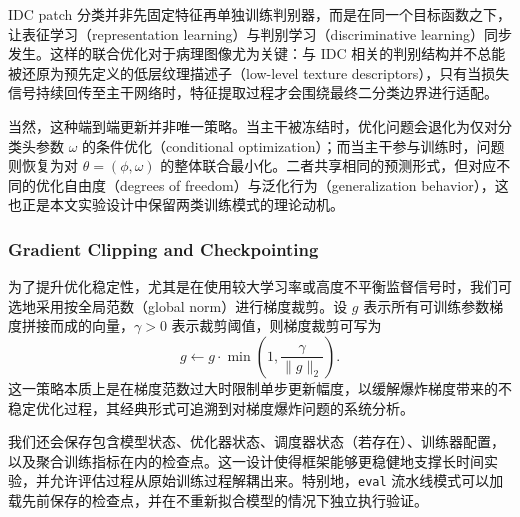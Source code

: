 IDC patch 分类并非先固定特征再单独训练判别器，而是在同一个目标函数之下，让表征学习（representation learning）与判别学习（discriminative learning）同步发生。这样的联合优化对于病理图像尤为关键：与 IDC 相关的判别结构并不总能被还原为预先定义的低层纹理描述子（low-level texture descriptors），只有当损失信号持续回传至主干网络时，特征提取过程才会围绕最终二分类边界进行适配。

当然，这种端到端更新并非唯一策略。当主干被冻结时，优化问题会退化为仅对分类头参数 $\omega$ 的条件优化（conditional optimization）；而当主干参与训练时，问题则恢复为对 $\theta=(\phi,\omega)$ 的整体联合最小化。二者共享相同的预测形式，但对应不同的优化自由度（degrees of freedom）与泛化行为（generalization behavior），这也正是本文实验设计中保留两类训练模式的理论动机\cite{Pan2010TransferLearning}。

\subsubsection{Gradient Clipping and Checkpointing}

为了提升优化稳定性，尤其是在使用较大学习率或高度不平衡监督信号时，我们可选地采用按全局范数（global norm）进行梯度裁剪。设 $g$ 表示所有可训练参数梯度拼接而成的向量，$\gamma > 0$ 表示裁剪阈值，则梯度裁剪可写为
\begin{equation}
    g \leftarrow g \cdot \min\left(1, \frac{\gamma}{\lVert g \rVert_{2}}\right).
\end{equation}
这一策略本质上是在梯度范数过大时限制单步更新幅度，以缓解爆炸梯度带来的不稳定优化过程，其经典形式可追溯到对梯度爆炸问题的系统分析\cite{Pascanu2013DifficultyRNN}。

我们还会保存包含模型状态、优化器状态、调度器状态（若存在）、训练器配置，以及聚合训练指标在内的检查点。这一设计使得框架能够更稳健地支撑长时间实验，并允许评估过程从原始训练过程解耦出来。特别地，\texttt{eval} 流水线模式可以加载先前保存的检查点，并在不重新拟合模型的情况下独立执行验证。
